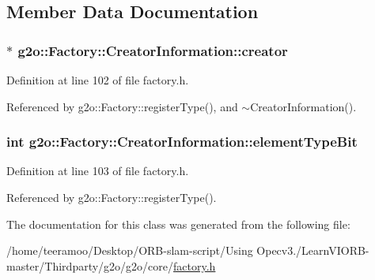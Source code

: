 \subsection{Member Data Documentation}
\subsubsection[{\texorpdfstring{creator}{creator}}]{$\ast$ g2o\+::\+Factory\+::\+Creator\+Information\+::creator}\hypertarget{classg2o_1_1Factory_1_1CreatorInformation_a9fd5a1087992c17f869f1d59bc519c23}{}\label{classg2o_1_1Factory_1_1CreatorInformation_a9fd5a1087992c17f869f1d59bc519c23}


Definition at line 102 of file factory.\+h.



Referenced by g2o\+::\+Factory\+::register\+Type(), and $\sim$\+Creator\+Information().

\subsubsection[{\texorpdfstring{element\+Type\+Bit}{elementTypeBit}}]{\setlength{\rightskip}{0pt plus 5cm}int g2o\+::\+Factory\+::\+Creator\+Information\+::element\+Type\+Bit}\hypertarget{classg2o_1_1Factory_1_1CreatorInformation_ab9fa4c8aec27d204f5ae6a7510c4e339}{}\label{classg2o_1_1Factory_1_1CreatorInformation_ab9fa4c8aec27d204f5ae6a7510c4e339}


Definition at line 103 of file factory.\+h.



Referenced by g2o\+::\+Factory\+::register\+Type().



The documentation for this class was generated from the following file\+:\begin{DoxyCompactItemize}
\item 
/home/teeramoo/\+Desktop/\+O\+R\+B-\/slam-\/script/\+Using Opecv3./\+Learn\+V\+I\+O\+R\+B-\/master/\+Thirdparty/g2o/g2o/core/\hyperlink{factory_8h}{factory.\+h}\end{DoxyCompactItemize}
